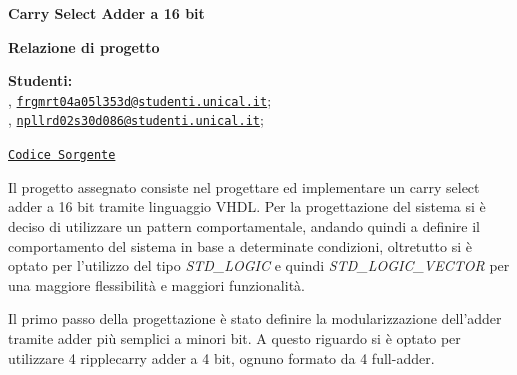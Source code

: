 



\usepackage{listings}
\usepackage{xcolor}





\begin{Large}
    \textsf{\textbf{Carry Select Adder a 16 bit}}\\
\end{Large}
\textbf{Relazione di progetto}

\vspace{1ex}

\textsf{\textbf{Studenti:}} \\
, \href{frgmrt04a05l353d@studenti.unical.it}{\texttt{frgmrt04a05l353d@studenti.unical.it}};\\
, \href{npllrd02s30d086@studenti.unical.it} {\texttt{npllrd02s30d086@studenti.unical.it}};

\href{https://github.com/Zi0LEO/elettronica_digitale}{\texttt{Codice Sorgente}}


\vspace{2ex}

Il progetto assegnato consiste nel progettare ed implementare un carry select adder a 16 bit tramite linguaggio VHDL.
Per la progettazione del sistema si è deciso di utilizzare un pattern comportamentale, andando quindi a definire il comportamento del sistema in base a determinate condizioni, oltretutto si è optato per l'utilizzo del tipo \textit{STD\_LOGIC} e quindi \textit{STD\_LOGIC\_VECTOR} per una maggiore flessibilità e maggiori funzionalità.

Il primo passo della progettazione è stato definire la modularizzazione dell'adder tramite adder più semplici a minori bit. 
A questo riguardo si è optato per utilizzare 4 ripplecarry adder a 4 bit, ognuno formato da 4 full-adder.

